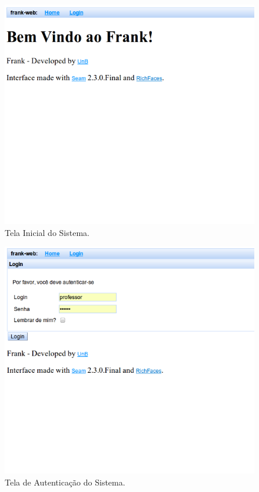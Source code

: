 \begin{figure}
	\centering
	\includegraphics[scale=0.6]{images/frank-tela-aluno-inicial.png}
	\caption{Tela Inicial do Sistema.}
	\label{fig:frank-tela-aluno-inicial}
\end{figure}


\begin{figure}
	\centering
	\includegraphics[scale=0.6]{images/frank-tela-aluno-login.png}
	\caption{Tela de Autenticação do Sistema.}
	\label{fig:frank-tela-aluno-login}
\end{figure}


